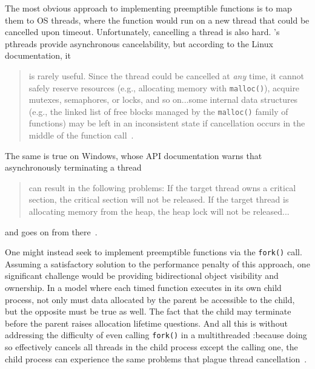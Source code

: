 The most obvious approach to implementing preemptible functions is to map them to
OS threads, where the function would run on a new thread that
could be cancelled upon timeout.  Unfortunately, cancelling a thread is also hard.
\Unix's pthreads provide
asynchronous cancelability, but according to the Linux documentation, it
\begin{quote}
\vspace{-3pt}
is rarely
useful.  Since the thread could be cancelled at \textit{any} time, it cannot safely
reserve resources (e.g., allocating memory with \texttt{malloc()}), acquire mutexes,
semaphores, or locks, and so on...\@ some internal data structures (e.g., the linked
list of free blocks managed by the \texttt{malloc()} family of functions) may be left
in an inconsistent state if cancellation occurs in the middle of the function
call~\cite{pthreadsetcanceltype-manpage}.
\end{quote}
The same is true on Windows, whose API
documentation warns that asynchronously terminating a thread
\begin{quote}
can result in the
following problems: If the target thread owns a critical section, the critical
section will not be released.  If the target thread is allocating memory from the
heap, the heap lock will not be released...
\end{quote}
and goes on from
there~\cite{www-microsoft-terminatethread}.

One might instead seek to implement preemptible functions via the \Unix
\texttt{fork()} call.  Assuming a satisfactory solution to the performance penalty
of this approach, one significant challenge would be providing bidirectional object
visibility and ownership.  In a model where each timed function executes in its own
child process, not only must data allocated by the parent be accessible to the child,
but the opposite must be true as well.  The fact that the child may terminate before
the parent raises allocation lifetime questions.  And all this is
without addressing the difficulty of even calling \texttt{fork()} in a multithreaded
\program:\@ because doing so effectively cancels all threads in the child process
except the calling one, the child process can experience the same problems that
plague thread cancellation~\cite{baumann:hotos2019}.

